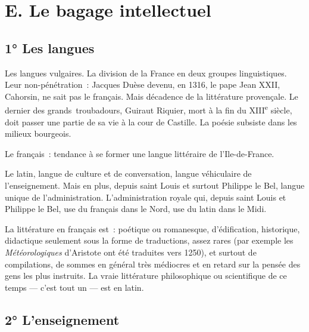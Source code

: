 \documentclass[french,twoside]{book} %
\begin{document}
\section[{E. Le bagage intellectuel}]{E. Le bagage intellectuel}
\label{c11e}
\subsection[{1° Les langues}]{1° Les langues}

\begin{listalpha}[itemsep=\baselineskip,]
\item  Les langues vulgaires. La division de la France en deux groupes linguistiques. Leur non-pénétration : Jacques Duèse devenu, en 1316, le pape Jean XXII, Cahorsin, ne sait pas le français. Mais décadence de la littérature provençale. Le dernier des grands troubadours, Guiraut Riquier, mort à la fin du XIII\textsuperscript{e} siècle, doit passer une partie de sa vie à la cour de Castille. La poésie subsiste dans les milieux bourgeois.\par
 Le français : tendance à se former une langue littéraire de l’Ile-de-France.
 
\item Le latin, langue de culture et de conversation, langue véhiculaire de l’enseignement. Mais en plus, depuis saint Louis et surtout Philippe le Bel, langue unique de l’administration. L’administration royale qui, depuis saint Louis et Philippe le Bel, use du français dans le Nord, use du latin dans le Midi.
\end{listalpha}

\noindent La littérature en français est : poétique ou romanesque, d’édification, historique, didactique seulement sous la forme de traductions, assez rares (par exemple les {\itshape Météorologiques} d’Aristote ont été traduites vers 1250), et surtout de compilations, de sommes en général très médiocres et en retard sur la pensée des gens les plus instruits. La vraie littérature philosophique ou scientifique de ce temps — c’est tout un — est en latin.
\subsection[{2° L’enseignement}]{2° L’enseignement}
\end{document}
